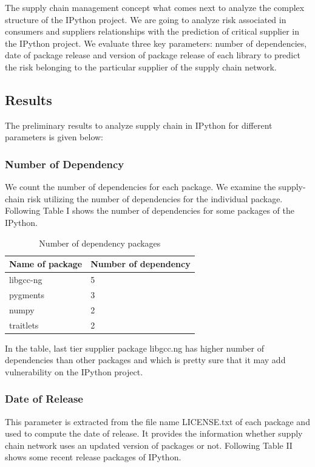 \documentclass[10pt,conference]{IEEEtran}
\begin{document}
The supply chain management concept what comes next to analyze the complex structure of the IPython project. We are going to analyze risk associated in consumers and suppliers relationships with the prediction of critical supplier in the IPython project. We evaluate three key parameters: number of dependencies, date of package release and version of package release of each library to predict the risk belonging to the particular supplier of the supply chain network.


\subsection {Results}

The preliminary results to analyze supply chain in IPython for different parameters is given below:  
\subsubsection{Number of Dependency}
We count the number of dependencies for each package. We examine the supply-chain risk utilizing the number of dependencies for the individual package. Following Table I shows the number of dependencies for some packages of the IPython. 

\begin{table} [h]
\begin{center}
\caption{Number of dependency packages}
\begin{tabular}{ |p{3.5cm}|p{3.5cm}| }
\hline
 Name of package & Number of dependency \\
 \hline
libgcc-ng  & 5\\
 \hline
pygments  & 3\\
    \hline
 numpy & 2\\
 \hline
 traitlets & 2\\

    \hline
   
\end{tabular}

\end{center}
\end{table}

In the table, last tier supplier package libgcc.ng has higher number of dependencies than other packages and which is pretty sure that it may add vulnerability on the IPython project.
\subsubsection{Date of Release}
This parameter is extracted from the file name LICENSE.txt of each package and used to compute the date of release. It provides the information whether supply chain network uses an updated version of packages or not. Following Table II shows some recent release packages of IPython.   
\end{document}
